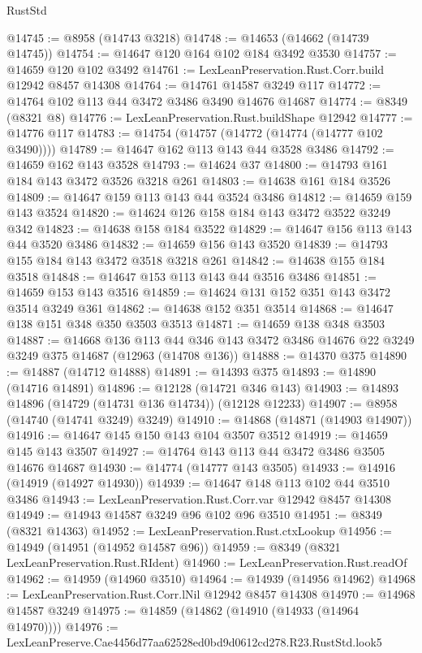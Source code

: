 \begin{lexlean}{RustStd}
\begin{coremodule}
@14745 := @8958 (@14743 @3218)
@14748 := @14653 (@14662 (@14739 @14745))
@14754 := @14647 @120 @164 @102 @184 @3492 @3530
@14757 := @14659 @120 @102 @3492
@14761 := LexLeanPreservation.Rust.Corr.build @12942 @8457 @14308
@14764 := @14761 @14587 @3249 @117
@14772 := @14764 @102 @113 @44 @3472 @3486 @3490 @14676 @14687
@14774 := @8349 (@8321 @8)
@14776 := LexLeanPreservation.Rust.buildShape @12942
@14777 := @14776 @117
@14783 := @14754 (@14757 (@14772 (@14774 (@14777 @102 @3490))))
@14789 := @14647 @162 @113 @143 @44 @3528 @3486
@14792 := @14659 @162 @143 @3528
@14793 := @14624 @37
@14800 := @14793 @161 @184 @143 @3472 @3526 @3218 @261
@14803 := @14638 @161 @184 @3526
@14809 := @14647 @159 @113 @143 @44 @3524 @3486
@14812 := @14659 @159 @143 @3524
@14820 := @14624 @126 @158 @184 @143 @3472 @3522 @3249 @342
@14823 := @14638 @158 @184 @3522
@14829 := @14647 @156 @113 @143 @44 @3520 @3486
@14832 := @14659 @156 @143 @3520
@14839 := @14793 @155 @184 @143 @3472 @3518 @3218 @261
@14842 := @14638 @155 @184 @3518
@14848 := @14647 @153 @113 @143 @44 @3516 @3486
@14851 := @14659 @153 @143 @3516
@14859 := @14624 @131 @152 @351 @143 @3472 @3514 @3249 @361
@14862 := @14638 @152 @351 @3514
@14868 := @14647 @138 @151 @348 @350 @3503 @3513
@14871 := @14659 @138 @348 @3503
@14887 := @14668
    @136
    @113
    @44
    @346
    @143
    @3472
    @3486
    @14676
    @22
    @3249
    @3249
    @375
    @14687
    (@12963 (@14708 @136))
@14888 := @14370 @375
@14890 := @14887 (@14712 @14888)
@14891 := @14393 @375
@14893 := @14890 (@14716 @14891)
@14896 := @12128 (@14721 @346 @143)
@14903 := @14893 @14896 (@14729 (@14731 @136 @14734)) (@12128 @12233)
@14907 := @8958 (@14740 (@14741 @3249) @3249)
@14910 := @14868 (@14871 (@14903 @14907))
@14916 := @14647 @145 @150 @143 @104 @3507 @3512
@14919 := @14659 @145 @143 @3507
@14927 := @14764 @143 @113 @44 @3472 @3486 @3505 @14676 @14687
@14930 := @14774 (@14777 @143 @3505)
@14933 := @14916 (@14919 (@14927 @14930))
@14939 := @14647 @148 @113 @102 @44 @3510 @3486
@14943 := LexLeanPreservation.Rust.Corr.var @12942 @8457 @14308
@14949 := @14943 @14587 @3249 @96 @102 @96 @3510
@14951 := @8349 (@8321 @14363)
@14952 := LexLeanPreservation.Rust.ctxLookup
@14956 := @14949 (@14951 (@14952 @14587 @96))
@14959 := @8349 (@8321 LexLeanPreservation.Rust.RIdent)
@14960 := LexLeanPreservation.Rust.readOf
@14962 := @14959 (@14960 @3510)
@14964 := @14939 (@14956 @14962)
@14968 := LexLeanPreservation.Rust.Corr.lNil @12942 @8457 @14308
@14970 := @14968 @14587 @3249
@14975 := @14859 (@14862 (@14910 (@14933 (@14964 @14970))))
@14976 := LexLeanPreserve.Cae4456d77aa62528ed0bd9d0612cd278.R23.RustStd.look5

\end{coremodule}
\end{lexlean}
